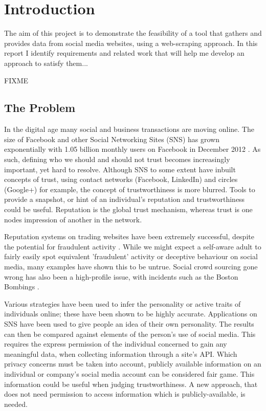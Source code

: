 \chapter{Introduction}\label{C:us}

The aim of this project is to demonstrate the feasibility of a tool that gathers and provides data from social media websites, using a web-scraping approach. In this report I identify requirements and related work that will help me develop an approach to satisfy them... 

FIXME

\section{The Problem}
In the digital age many social and business transactions are moving online. The size of Facebook and other Social Networking Sites (SNS) has grown exponentially with 1.05 billion monthly users on Facebook in December 2012 \cite{fb_users}. As such, defining who we should and should not trust becomes increasingly important, yet hard to resolve. Although SNS to some extent have inbuilt concepts of trust, using contact networks (Facebook, LinkedIn) and circles (Google+) for example, the concept of trustworthiness is more blurred. Tools to provide a snapshot, or hint of an individual's reputation and trustworthiness could be useful. Reputation is the global trust mechanism, whereas trust is one nodes impression of another in the network.

Reputation systems on trading websites have been extremely successful, despite the potential for fraudulent activity \cite{}. While we might expect a self-aware adult to fairly easily spot equivalent 'fraudulent' activity or deceptive behaviour on social media, many examples have shown this to be untrue. Social crowd sourcing gone wrong has also been a high-profile issue, with incidents such as the Boston Bombings \cite{}.

Various strategies have been used to infer the personality or active traits of individuals online; these have been shown to be highly accurate. Applications on SNS have been used to give people an idea of their own personality. The results can then be compared against elements of the person's use of social media. This requires the express permission of the individual concerned to gain any meaningful data, when collecting information through a site's API. Which privacy concerns must be taken into account, publicly available information on an individual or company's social media account can be considered fair game. This information could be useful when judging trustworthiness. A new approach, that does not need permission to access information which is publicly-available, is needed. 

